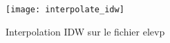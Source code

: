 \begin{figure}[ht]
   \begin{center}
   \texttt{[image: interpolate\_idw]}
   \caption{Interpolation IDW sur le fichier elevp \nixcaption}\label{fig:interpolation_idw}
\end{center}  
\end{figure}